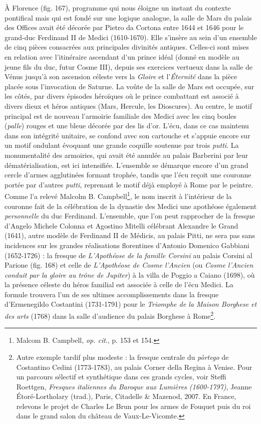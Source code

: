 \documentclass[12pt,twoside,openany]{book}
\begin{document}
À Florence (fig. 167), programme qui nous éloigne un instant du contexte pontifical mais qui est fondé sur une logique analogue, la salle de Mars du palais des Offices avait été décorée par Pietro da Cortona entre 1644 et 1646 pour le grand-duc Ferdinand II de Medici (1610-1670). Elle s’insère au sein d’un ensemble de cinq pièces consacrées aux principales divinités antiques. Celles-ci sont mises en relation avec l’itinéraire ascendant d’un prince idéal (donné en modèle au jeune fils du duc, futur Cosme III), depuis ses exercices vertueux dans la salle de Vénus jusqu’à son ascension céleste vers la \textit{Gloire} et l’\textit{Éternité} dans la pièce placée sous l’invocation de Saturne. La voûte de la salle de Mars est occupée, sur les côtés, par divers épisodes héroïques où le prince combattant est associé à divers dieux et héros antiques (Mars, Hercule, les Dioscures). Au centre, le motif principal est de nouveau l’armoirie familiale des Medici avec les cinq boules (\textit{palle}) rouges et une bleue décorée par des lis d’or. L’écu, dans ce cas maintenu dans son intégrité unitaire, se confond avec son cartouche et s’appuie encore sur un motif ondulant évoquant une grande coquille soutenue par trois \textit{putti}. La monumentalité des armoiries, qui avait été annulée au palais Barberini par leur dématérialisation, est ici intensifiée. L’ensemble se démarque encore d’un grand cercle d’armes agglutinées formant trophée, tandis que l’écu reçoit une couronne portée par d’autres \textit{putti,} reprenant le motif déjà employé à Rome par le peintre. Comme l’a relevé Malcolm B. Campbell\footnote{Malcom B. Campbell, \textit{op. cit}., p. 153 et 154.}, le nom inscrit à l’intérieur de la couronne fait de la célébration de la dynastie des Medici une apothéose également \textit{personnelle} du duc Ferdinand. L’ensemble, que l’on peut rapprocher de la fresque d’Angelo Michele Colonna et Agostino Mitelli célébrant Alexandre le Grand (1641), autre modèle de Ferdinand II de Médicis, au palais Pitti, ne sera pas sans incidences sur les grandes réalisations florentines d’Antonio Domenico Gabbiani (1652-1726) : la fresque de \textit{L’Apothéose de la famille Corsini} au palais Corsini al Parione (fig. 168) et celle de \textit{L’Apothéose de Cosme l’Ancien} (ou \textit{Cosme l’Ancien conduit par la gloire au trône de Jupiter}) à la villa de Poggio a Caiano (1698), où la présence céleste du héros familial est associée à celle de l’écu Medici. La formule trouvera l’un de ses ultimes accomplissements dans la fresque d’Ermenegildo Costantini (1731-1791) pour le \textit{Triomphe de la Maison Borghese et des arts} (1768) dans la salle d’audience du palais Borghese à Rome\footnote{Autre exemple tardif plus modeste : la fresque centrale du \textit{pòrtego} de Costantino Cedini (1773-1783), au palais Corner della Regina à Venise. Pour un parcours sélectif et synthétique dans ces grands cycles, voir Steffi Roettgen, \textit{Fresques italiennes du Baroque aux Lumières (1600-1797)}, Jeanne Étoré-Lortholary (trad.), Paris, Citadelle \& Mazenod, 2007. En France, relevons le projet de Charles Le Brun pour les armes de Fouquet puis du roi dans le grand salon du château de Vaux-Le-Vicomte.}.
\end{document}
